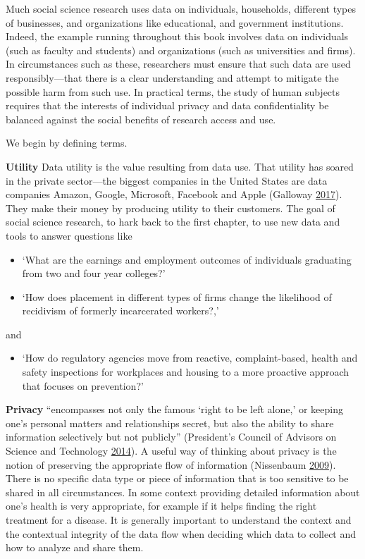 \documentclass[]{krantz}
\providecommand{\tightlist}{%
  \setlength{\itemsep}{0pt}\setlength{\parskip}{0pt}}
\begin{document}
Much social science research uses data on individuals, households,
different types of businesses, and organizations like educational, and
government institutions. Indeed, the example running throughout this
book involves data on individuals (such as faculty and students) and
organizations (such as universities and firms). In circumstances such as
these, researchers must ensure that such data are used
responsibly---that there is a clear understanding and attempt to
mitigate the possible harm from such use. In practical terms, the study
of human subjects requires that the interests of individual privacy and
data confidentiality be balanced against the social benefits of research
access and use.

We begin by defining terms.

\textbf{Utility} Data utility is the value resulting from data use. That
utility has soared in the private sector---the biggest companies in the
United States are data companies Amazon, Google, Microsoft, Facebook and
Apple (Galloway \protect\hyperlink{ref-galloway2017four}{2017}). They
make their money by producing utility to their customers. The goal of
social science research, to hark back to the first chapter, to use new
data and tools to answer questions like

\begin{itemize}
\item
  `What are the earnings and employment outcomes of individuals
  graduating from two and four year colleges?'
\item
  `How does placement in different types of firms change the likelihood
  of recidivism of formerly incarcerated workers?,'
\end{itemize}

and

\begin{itemize}
\tightlist
\item
  `How do regulatory agencies move from reactive, complaint-based,
  health and safety inspections for workplaces and housing to a more
  proactive approach that focuses on prevention?'
\end{itemize}

\textbf{Privacy} ``encompasses not only the famous `right to be left
alone,' or keeping one's personal matters and relationships secret, but
also the ability to share information selectively but not publicly''
(President's Council of Advisors on Science and Technology
\protect\hyperlink{ref-house2014big}{2014}). A useful way of thinking
about privacy is the notion of preserving the appropriate flow of
information (Nissenbaum \protect\hyperlink{ref-nissenbaum2009}{2009}).
There is no specific data type or piece of information that is too
sensitive to be shared in all circumstances. In some context providing
detailed information about one's health is very appropriate, for example
if it helps finding the right treatment for a disease. It is generally
important to understand the context and the contextual integrity of the
data flow when deciding which data to collect and how to analyze and
share them.
\end{document}
